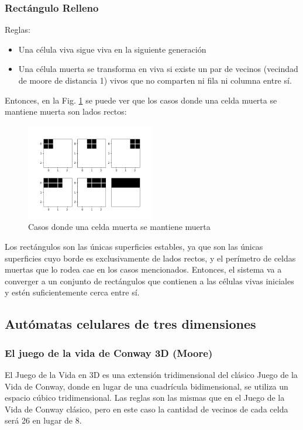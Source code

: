 \subsubsection{Rectángulo Relleno}
Reglas:
\begin{itemize}
    \item Una célula viva sigue viva en la siguiente generación
    \item Una célula muerta se transforma en viva si existe un par de vecinos (vecindad de moore de distancia 1) vivos que no comparten ni fila ni columna entre sí.
\end{itemize}
Entonces, en la Fig. \ref{fig:fill} se puede ver que los casos donde una celda muerta se mantiene muerta son lados rectos:
\begin{figure}[H]
    \centering
    \includegraphics[width=0.5\textwidth]{Images/fill_example_1a}
    \caption{Casos donde una celda muerta se mantiene muerta}
    \label{fig:fill}
\end{figure}
Los rectángulos son las únicas superficies estables, ya que son las únicas superficies cuyo borde es exclusivamente de lados rectos, y el perímetro de celdas muertas que lo rodea cae en los casos mencionados.
Entonces, el sistema va a converger a un conjunto de rectángulos que contienen a las células vivas iniciales y estén suficientemente cerca entre sí.

\subsection{Autómatas celulares de tres dimensiones}
\label{subsec:3d}

\subsubsection{El juego de la vida de Conway 3D (Moore)}
El Juego de la Vida en 3D es una extensión tridimensional del clásico Juego de la Vida de Conway, donde en lugar de una cuadrícula bidimensional, se utiliza un espacio cúbico tridimensional.
Las reglas son las mismas que en el Juego de la Vida de Conway clásico, pero en este caso la cantidad de vecinos de cada celda será 26 en lugar de 8.

